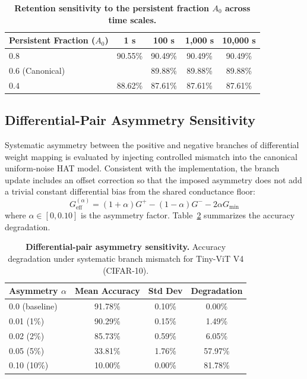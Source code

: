\begin{table}[ht]
\centering
\caption{\textbf{Retention sensitivity to the persistent fraction $A_0$ across time scales.}}
\label{tab:retention-sensitivity}
\begin{tabular}{@{}lcccc@{}}
\toprule
\textbf{Persistent Fraction ($A_0$)} & \textbf{1 s} & \textbf{100 s} & \textbf{1,000 s} & \textbf{10,000 s} \\
\midrule
$0.8$ & 90.55\% & 90.49\% & 90.49\% & 90.49\% \\
$0.6$ (Canonical) & \notrun{} & 89.88\% & 89.88\% & 89.88\% \\
$0.4$ & 88.62\% & 87.61\% & 87.61\% & 87.61\% \\
\bottomrule
\end{tabular}
\end{table}

\subsection{Differential-Pair Asymmetry Sensitivity}
\label{subsec:supp-asymmetry-sensitivity}

Systematic asymmetry between the positive and negative branches of differential weight mapping is evaluated by injecting controlled mismatch into the canonical uniform-noise HAT model. Consistent with the implementation, the branch update includes an offset correction so that the imposed asymmetry does not add a trivial constant differential bias from the shared conductance floor:
\begin{equation}
G^{(\alpha)}_{\mathrm{eff}} = (1+\alpha)G^{+} - (1-\alpha)G^{-} - 2\alpha G_{\min}
\end{equation}
where $\alpha \in [0, 0.10]$ is the asymmetry factor. Table~\ref{tab:asymmetry-sensitivity} summarizes the accuracy degradation.

\begin{table}[ht]
\centering
\caption{\textbf{Differential-pair asymmetry sensitivity.} Accuracy degradation under systematic branch mismatch for Tiny-ViT V4 (CIFAR-10).}
\label{tab:asymmetry-sensitivity}
\begin{tabular}{@{}lccc@{}}
\toprule
\textbf{Asymmetry $\alpha$} & \textbf{Mean Accuracy} & \textbf{Std Dev} & \textbf{Degradation} \\
\midrule
0.0 (baseline) & 91.78\% & 0.10\% & 0.00\% \\
0.01 (1\%) & 90.29\% & 0.15\% & 1.49\% \\
0.02 (2\%) & 85.73\% & 0.59\% & 6.05\% \\
0.05 (5\%) & 33.81\% & 1.76\% & 57.97\% \\
0.10 (10\%) & 10.00\% & 0.00\% & 81.78\% \\
\bottomrule
\end{tabular}
\end{table}

